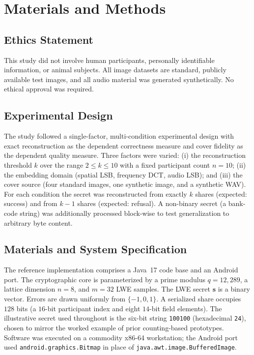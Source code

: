 \documentclass[preprint,12pt,number]{elsarticle}
\begin{document}
\section{Materials and Methods}
\label{sec:methods}

\subsection{Ethics Statement}

This study did not involve human participants, personally identifiable
information, or animal subjects. All image datasets are standard, publicly
available test images, and all audio material was generated synthetically. No
ethical approval was required.

\subsection{Experimental Design}

The study followed a single-factor, multi-condition experimental design with
exact reconstruction as the dependent correctness measure and cover fidelity as
the dependent quality measure. Three factors were varied: (i) the
reconstruction threshold $k$ over the range $2 \le k \le 10$ with a fixed
participant count $n = 10$; (ii) the embedding domain (spatial LSB, frequency
DCT, audio LSB); and (iii) the cover source (four standard images, one
synthetic image, and a synthetic WAV). For each condition the secret was
reconstructed from exactly $k$ shares (expected: success) and from $k-1$ shares
(expected: refusal). A non-binary secret (a bank-code string) was additionally
processed block-wise to test generalization to arbitrary byte content.

\subsection{Materials and System Specification}

The reference implementation comprises a Java~17 code base and an Android port.
The cryptographic core is parameterized by a prime modulus $q = 12{,}289$, a
lattice dimension $n = 8$, and $m = 32$ LWE samples. The LWE secret $\mathbf{s}$
is a binary vector. Errors are drawn uniformly from $\{-1,0,1\}$. A serialized
share occupies $128$ bits (a $16$-bit participant index and eight $14$-bit
field elements). The illustrative secret used throughout is the six-bit string
\texttt{100100} (hexadecimal \texttt{24}), chosen to mirror the worked example
of prior counting-based prototypes. Software was executed on a commodity
x86-64 workstation; the Android port used \texttt{android.graphics.Bitmap} in
place of \texttt{java.awt.image.BufferedImage}.
\end{document}
